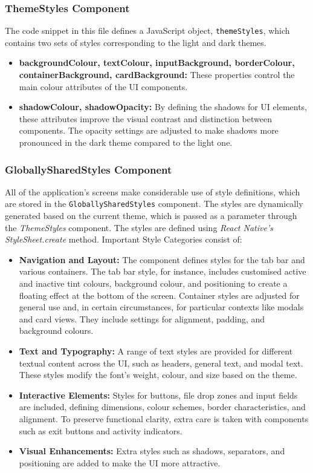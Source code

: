 \subsubsection{ThemeStyles Component}

The code snippet in this file defines a JavaScript object, \texttt{themeStyles}, which contains two sets of styles corresponding to the light and dark themes.

\begin{itemize}
    \item \textbf{backgroundColour, textColour, inputBackground, borderColour, containerBackground, cardBackground:} These properties control the main colour attributes of the UI components.
    \item \textbf{shadowColour, shadowOpacity:} By defining the shadows for UI elements, these attributes improve the visual contrast and distinction between components. The opacity settings are adjusted to make shadows more pronounced in the dark theme compared to the light one.
\end{itemize}

\subsubsection{GloballySharedStyles Component}

All of the application's screens make considerable use of style definitions, which are stored in the \texttt{GloballySharedStyles} component. The styles are dynamically generated based on the current theme, which is passed as a parameter through the \textit{ThemeStyles} component. The styles are defined using \textit{React Native's} \textit{StyleSheet.create} method. Important Style Categories consist of:

\begin{itemize}
    \item \textbf{Navigation and Layout:} The component defines styles for the tab bar and various containers. The tab bar style, for instance, includes customised active and inactive tint colours, background colour, and positioning to create a floating effect at the bottom of the screen. Container styles are adjusted for general use and, in certain circumstances, for particular contexts like modals and card views. They include settings for alignment, padding, and background colours.
    \item \textbf{Text and Typography:} A range of text styles are provided for different textual content across the UI, such as headers, general text, and modal text. These styles modify the font's weight, colour, and size based on the theme.
    \item \textbf{Interactive Elements:} Styles for buttons, file drop zones and input fields are included, defining dimensions, colour schemes, border characteristics, and alignment. To preserve functional clarity, extra care is taken with components such as exit buttons and activity indicators.
    \item \textbf{Visual Enhancements:} Extra styles such as shadows, separators, and positioning are added to make the UI more attractive.
\end{itemize}

